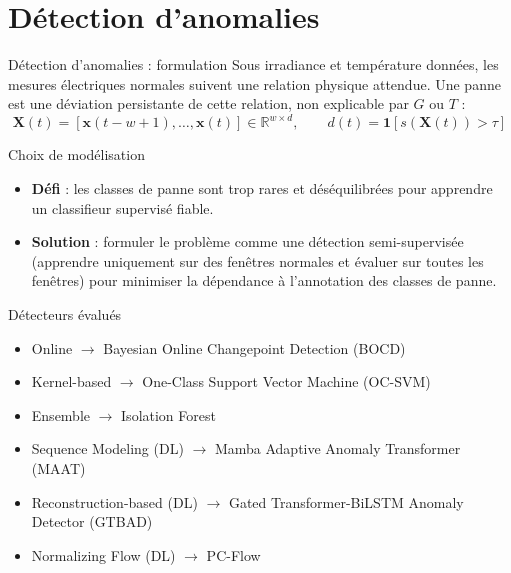 \documentclass[10pt,aspectratio=169]{beamer}
\begin{document}
\section{Détection d'anomalies}

\begin{frame}{Détection d'anomalies : formulation}
  \footnotesize
  Sous irradiance et température données, les mesures électriques normales suivent une relation physique attendue. Une panne est une \alert{déviation persistante} de cette relation, non explicable par $G$ ou $T$ :
  \[
    \mathbf{X}(t) = [\mathbf{x}(t-w+1), \ldots, \mathbf{x}(t)] \in \mathbb{R}^{w \times d}, \qquad
    d(t) = \mathbf{1}\!\left[s(\mathbf{X}(t)) > \tau\right]
  \]
\end{frame}

\begin{frame}{Choix de modélisation}
  \footnotesize
  \begin{itemize}
    \item \textbf{Défi} : les classes de panne sont trop rares et déséquilibrées pour apprendre un classifieur supervisé fiable.
    \item \textbf{Solution} : formuler le problème comme une détection \alert{semi-supervisée} (apprendre uniquement sur des fenêtres normales et évaluer sur toutes les fenêtres) pour minimiser la dépendance à l'annotation des classes de panne.
  \end{itemize}
\end{frame}

\begin{frame}{Détecteurs évalués}
  \footnotesize
  \begin{itemize}
    \item Online $\rightarrow$ Bayesian Online Changepoint Detection (BOCD)
    \item Kernel-based $\rightarrow$ One-Class Support Vector Machine (OC-SVM)
    \item Ensemble $\rightarrow$ Isolation Forest
    \item Sequence Modeling (DL) $\rightarrow$ Mamba Adaptive Anomaly Transformer (MAAT)
    \item Reconstruction-based (DL) $\rightarrow$ Gated Transformer-BiLSTM Anomaly Detector (GTBAD)
    \item Normalizing Flow (DL) $\rightarrow$ PC-Flow
  \end{itemize}
\end{frame}
\end{document}
